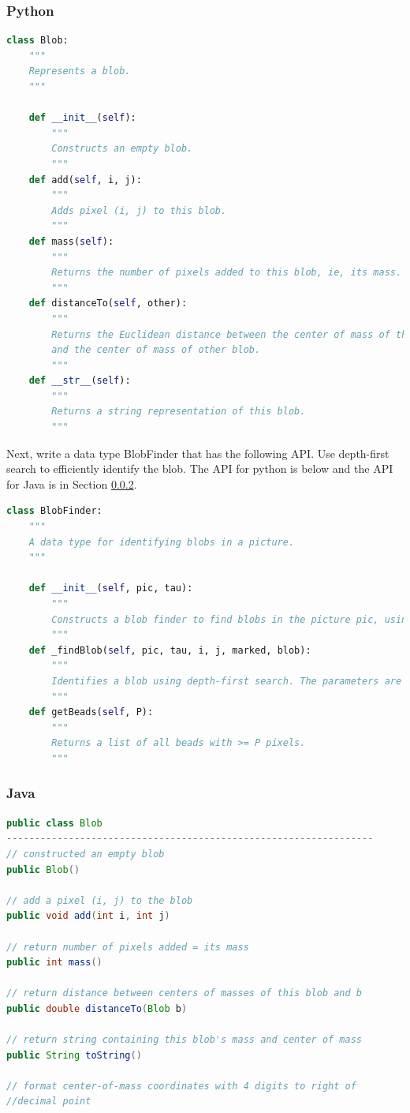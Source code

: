 \documentclass[]{article}
\begin{document}
\subsubsection{Python}
\begin{lstlisting}[language=Python]
    class Blob:
    """
    Represents a blob.
    """

    def __init__(self):
        """
        Constructs an empty blob.
        """
    def add(self, i, j):
        """
        Adds pixel (i, j) to this blob.
        """
    def mass(self):
        """
        Returns the number of pixels added to this blob, ie, its mass.
        """
    def distanceTo(self, other):
        """
        Returns the Euclidean distance between the center of mass of this blob
        and the center of mass of other blob.
        """
    def __str__(self):
        """
        Returns a string representation of this blob.
        """

\end{lstlisting}
Next, write a data type BlobFinder that has the following API. Use depth-first search to efficiently identify the blob. The API for python is below and the API for Java is in Section \ref{sec:Java:blobfinder}.
\begin{lstlisting}[language=Python]
    class BlobFinder:
    """
    A data type for identifying blobs in a picture.
    """

    def __init__(self, pic, tau):
        """
        Constructs a blob finder to find blobs in the picture pic, using a luminance threshold tau.
        """
    def _findBlob(self, pic, tau, i, j, marked, blob):
        """
        Identifies a blob using depth-first search. The parameters are the picture (pic), luminance threshold (tau), pixel column (i), pixel row (j), 2D boolean matrix (marked), and the blob being identified (blob).
        """
    def getBeads(self, P):
        """
        Returns a list of all beads with >= P pixels.
        """

\end{lstlisting}

 \subsubsection{Java} \label{sec:Java:blobfinder}
\begin{lstlisting}[language=Java]
public class Blob
-----------------------------------------------------------------
// constructed an empty blob
public Blob()        

// add a pixel (i, j) to the blob
public void add(int i, int j)  

// return number of pixels added = its mass
public int mass()   

// return distance between centers of masses of this blob and b
public double distanceTo(Blob b) 

// return string containing this blob's mass and center of mass
public String toString()         

// format center-of-mass coordinates with 4 digits to right of 
//decimal point
\end{lstlisting}
\end{document}
